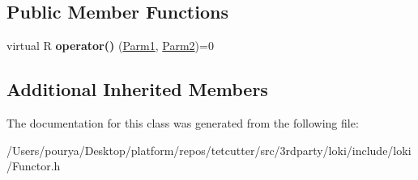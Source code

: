 \subsection*{Public Member Functions}
\begin{DoxyCompactItemize}
\item 
\hypertarget{classLoki_1_1FunctorImpl_3_01R_00_01Seq_3_01P1_00_01P2_01_4_00_01ThreadingModel_01_4_a7751b83b6ad57ebbd651cacb43449220}{}virtual R {\bfseries operator()} (\hyperlink{classLoki_1_1EmptyType}{Parm1}, \hyperlink{classLoki_1_1EmptyType}{Parm2})=0\label{classLoki_1_1FunctorImpl_3_01R_00_01Seq_3_01P1_00_01P2_01_4_00_01ThreadingModel_01_4_a7751b83b6ad57ebbd651cacb43449220}

\end{DoxyCompactItemize}
\subsection*{Additional Inherited Members}


The documentation for this class was generated from the following file\+:\begin{DoxyCompactItemize}
\item 
/\+Users/pourya/\+Desktop/platform/repos/tetcutter/src/3rdparty/loki/include/loki/Functor.\+h\end{DoxyCompactItemize}
